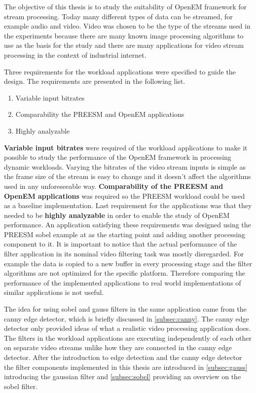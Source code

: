 The objective of this thesis is to study the suitability of OpenEM framework for stream processing. Today many different types of data can be streamed, for example audio and video. Video was chosen to be the type of the streams used in the experiments because there are many known image processing algorithms to use as the basis for the study and there are many applications for video stream processing in the context of industrial internet. 

Three requirements for the workload applications were specified to guide the design. The requirements are presented in the following list.

\begin{enumerate}
    \item{Variable input bitrates}
    \item{Comparability the PREESM and OpenEM applications}
    \item{Highly analyzable}
\end{enumerate}

\textbf{Variable input bitrates} were required of the workload applications to make it possible to study the performance of the OpenEM framework in processing dynamic workloads. Varying the bitrates of the video stream inputs is simple as the frame size of the stream is easy to change and it doesn't affect the algorithms used in any unforeseeable way. \textbf{Comparability of the PREESM and OpenEM applications} was required so the PREESM workload could be used as a baseline implementation. Last requirement for the applications was that they needed to be \textbf{highly analyzable} in order to enable the study of OpenEM performance. An application satisfying these requirements was designed using the PREESM sobel example at \cite{preesmtut} as the starting point and adding another processing component to it. It is important to notice that the actual performance of the filter application in its nominal video filtering task was mostly disregarded. For example the data is copied to a new buffer in every processing stage and the filter algorithms are not optimized for the specific platform. Therefore comparing the performance of the implemented applications to real world implementations of similar applications is not useful.

The idea for using sobel and gauss filters in the same application came from the canny edge detector, which is briefly discussed in \ref{subsec:canny}. The canny edge detector only provided ideas of what a realistic video processing application does. The filters in the workload applications are executing independently of each other on separate video streams unlike how they are connected in the canny edge detector. After the introduction to edge detection and the canny edge detector the filter components implemented in this thesis are introduced in \ref{subsec:gauss} introducing the gaussian filter and \ref{subsec:sobel} providing an overview on the sobel filter.\\

